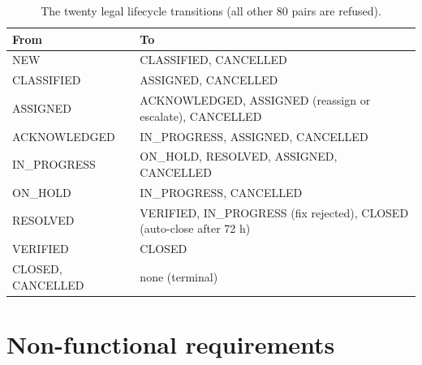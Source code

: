 \begin{table}[htbp]
\centering\small
\caption{The twenty legal lifecycle transitions (all other 80 pairs are refused).}
\label{tab:transitions}
\begin{tabular}{@{}ll@{}}
\toprule
\textbf{From} & \textbf{To} \\
\midrule
NEW & CLASSIFIED, CANCELLED \\
CLASSIFIED & ASSIGNED, CANCELLED \\
ASSIGNED & ACKNOWLEDGED, ASSIGNED (reassign or escalate), CANCELLED \\
ACKNOWLEDGED & IN\_PROGRESS, ASSIGNED, CANCELLED \\
IN\_PROGRESS & ON\_HOLD, RESOLVED, ASSIGNED, CANCELLED \\
ON\_HOLD & IN\_PROGRESS, CANCELLED \\
RESOLVED & VERIFIED, IN\_PROGRESS (fix rejected), CLOSED (auto-close after 72 h) \\
VERIFIED & CLOSED \\
CLOSED, CANCELLED & none (terminal) \\
\bottomrule
\end{tabular}
\end{table}

\section{Non-functional requirements}

